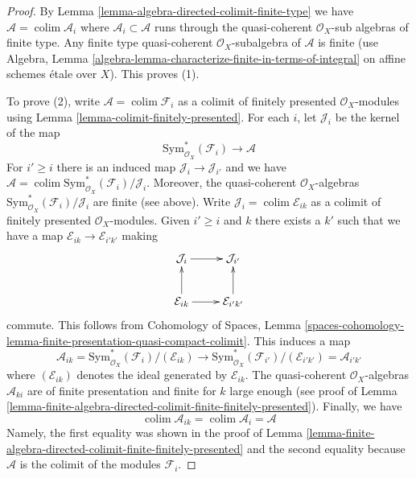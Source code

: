 \documentclass{stacks-project}
\theoremstyle{plain}
\theoremstyle{definition}
\theoremstyle{remark}
\numberwithin{equation}{subsection}
\def\colim{\mathop{\mathrm{colim}}\nolimits}
\begin{document}
\begin{proof}
By Lemma \ref{lemma-algebra-directed-colimit-finite-type} we have
$\mathcal{A} = \colim \mathcal{A}_i$ where
$\mathcal{A}_i \subset \mathcal{A}$ runs through the
quasi-coherent $\mathcal{O}_X$-sub algebras of finite type.
Any finite type quasi-coherent $\mathcal{O}_X$-subalgebra
of $\mathcal{A}$ is finite (use Algebra, Lemma
\ref{algebra-lemma-characterize-finite-in-terms-of-integral}
on affine schemes \'etale over $X$). This proves (1).

\medskip\noindent
To prove (2), write $\mathcal{A} = \colim \mathcal{F}_i$
as a colimit of finitely presented $\mathcal{O}_X$-modules using
Lemma \ref{lemma-colimit-finitely-presented}.
For each $i$, let $\mathcal{J}_i$ be the kernel of the map
$$
\text{Sym}^*_{\mathcal{O}_X}(\mathcal{F}_i) \longrightarrow \mathcal{A}
$$
For $i' \geq i$ there is an induced map $\mathcal{J}_i \to \mathcal{J}_{i'}$
and we have $\mathcal{A} =
\colim \text{Sym}^*_{\mathcal{O}_X}(\mathcal{F}_i)/\mathcal{J}_i$.
Moreover, the quasi-coherent $\mathcal{O}_X$-algebras
$\text{Sym}^*_{\mathcal{O}_X}(\mathcal{F}_i)/\mathcal{J}_i$
are finite (see above). Write $\mathcal{J}_i = \colim \mathcal{E}_{ik}$
as a colimit of finitely presented $\mathcal{O}_X$-modules.
Given $i' \geq i$ and $k$ there exists a $k'$ such that we
have a map $\mathcal{E}_{ik} \to \mathcal{E}_{i'k'}$
making
$$
\xymatrix{
\mathcal{J}_i \ar[r] & \mathcal{J}_{i'} \\
\mathcal{E}_{ik} \ar[u] \ar[r] & \mathcal{E}_{i'k'} \ar[u]
}
$$
commute. This follows from
Cohomology of Spaces, Lemma
\ref{spaces-cohomology-lemma-finite-presentation-quasi-compact-colimit}.
This induces a map
$$
\mathcal{A}_{ik} =
\text{Sym}^*_{\mathcal{O}_X}(\mathcal{F}_i)/(\mathcal{E}_{ik})
\longrightarrow
\text{Sym}^*_{\mathcal{O}_X}(\mathcal{F}_{i'})/(\mathcal{E}_{i'k'}) =
\mathcal{A}_{i'k'}
$$
where $(\mathcal{E}_{ik})$ denotes the ideal generated by $\mathcal{E}_{ik}$.
The quasi-coherent $\mathcal{O}_X$-algebras $\mathcal{A}_{ki}$
are of finite presentation and finite for $k$ large enough
(see proof of
Lemma \ref{lemma-finite-algebra-directed-colimit-finite-finitely-presented}).
Finally, we have
$$
\colim \mathcal{A}_{ik} = \colim \mathcal{A}_i = \mathcal{A}
$$
Namely, the first equality was shown in the proof of
Lemma \ref{lemma-finite-algebra-directed-colimit-finite-finitely-presented}
and the second equality because $\mathcal{A}$ is the colimit of
the modules $\mathcal{F}_i$.
\end{proof}
\end{document}
